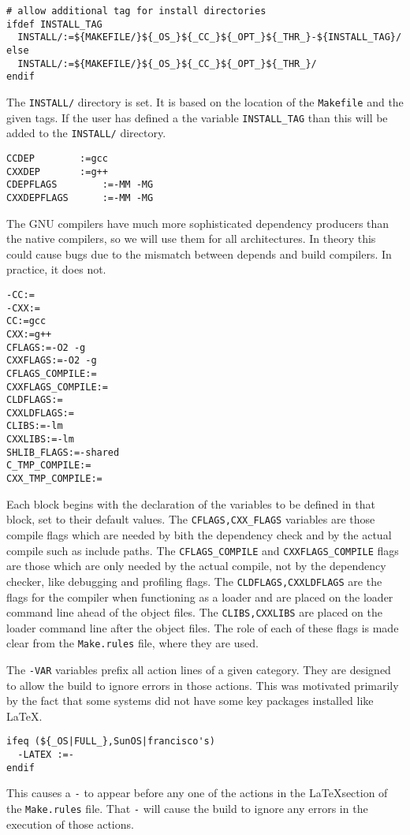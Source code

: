 \documentclass[letterpaper]{article}
\begin{document}
\begin{verbatim}
# allow additional tag for install directories
ifdef INSTALL_TAG
  INSTALL/:=${MAKEFILE/}${_OS_}${_CC_}${_OPT_}${_THR_}-${INSTALL_TAG}/
else
  INSTALL/:=${MAKEFILE/}${_OS_}${_CC_}${_OPT_}${_THR_}/
endif
\end{verbatim}
The \verb+INSTALL/+ directory is set.  It is based on the location
of the \verb+Makefile+ and the given tags.
If the user has defined a the variable \verb+INSTALL_TAG+ than this
will be added to the \verb+INSTALL/+ directory.

\begin{verbatim}
CCDEP		 :=gcc
CXXDEP		 :=g++
CDEPFLAGS        :=-MM -MG
CXXDEPFLAGS      :=-MM -MG
\end{verbatim}
The GNU compilers have much more sophisticated dependency producers than
the native compilers, so we will use them for all architectures.  In
theory this could cause bugs due to the mismatch between depends and
build compilers.  In practice, it does not.

\begin{verbatim}
-CC:=
-CXX:=
CC:=gcc
CXX:=g++
CFLAGS:=-O2 -g
CXXFLAGS:=-O2 -g
CFLAGS_COMPILE:=
CXXFLAGS_COMPILE:=
CLDFLAGS:=
CXXLDFLAGS:=
CLIBS:=-lm
CXXLIBS:=-lm
SHLIB_FLAGS:=-shared
C_TMP_COMPILE:=
CXX_TMP_COMPILE:=
\end{verbatim}
Each block begins with the declaration of the variables to be defined
in that block, set to their default values.
The \verb+CFLAGS,CXX_FLAGS+
variables are those compile flags which are needed by bith the
dependency check and by the actual compile such as
include paths.  The \verb+CFLAGS_COMPILE+
and \verb+CXXFLAGS_COMPILE+ flags are those which are only needed by
the actual compile, not by the dependency checker, like debugging
and profiling flags.  The \verb+CLDFLAGS,CXXLDFLAGS+ are the flags
for the compiler when functioning as a loader and are placed on
the loader command line ahead of the object files.  The
\verb+CLIBS,CXXLIBS+ are placed on the loader command line after the
object files.  The role of each of these flags is made clear from the
\verb+Make.rules+ file, where they are used.

The \verb+-VAR+ variables prefix all action lines of a given category.
They are designed to allow the build to ignore errors in those actions.
This was motivated primarily by the fact that some systems did not have
some key packages installed like \LaTeX.
\begin{verbatim}
ifeq (${_OS|FULL_},SunOS|francisco's)
  -LATEX :=-
endif
\end{verbatim}
This causes a \verb+-+ to appear before any one of the actions in the
\LaTeX section of the \verb+Make.rules+ file.  That \verb+-+ will cause
the build to ignore any errors in the execution of those actions.
\end{document}
